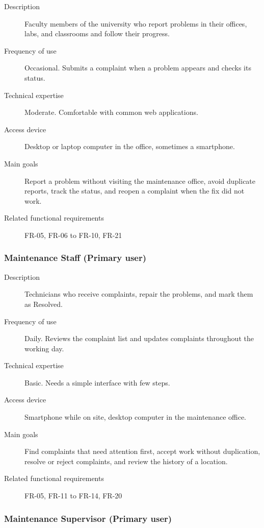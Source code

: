 \begin{description}
  \item[Description] Faculty members of the university who report problems in their offices, labs, and classrooms and follow their progress.
  \item[Frequency of use] Occasional. Submits a complaint when a problem appears and checks its status.
  \item[Technical expertise] Moderate. Comfortable with common web applications.
  \item[Access device] Desktop or laptop computer in the office, sometimes a smartphone.
  \item[Main goals] Report a problem without visiting the maintenance office, avoid duplicate reports, track the status, and reopen a complaint when the fix did not work.
  \item[Related functional requirements] FR-05, FR-06 to FR-10, FR-21
\end{description}

\subsubsection*{Maintenance Staff (Primary user)}

\begin{description}
  \item[Description] Technicians who receive complaints, repair the problems, and mark them as Resolved.
  \item[Frequency of use] Daily. Reviews the complaint list and updates complaints throughout the working day.
  \item[Technical expertise] Basic. Needs a simple interface with few steps.
  \item[Access device] Smartphone while on site, desktop computer in the maintenance office.
  \item[Main goals] Find complaints that need attention first, accept work without duplication, resolve or reject complaints, and review the history of a location.
  \item[Related functional requirements] FR-05, FR-11 to FR-14, FR-20
\end{description}

\subsubsection*{Maintenance Supervisor (Primary user)}

